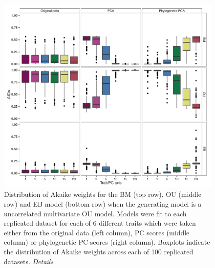 \documentclass[a4paper,12pt]{article}
\begin{document}
\begin{figure}[p]
\centering
\includegraphics[scale=0.65]{./fig/box-aicw-mvou.pdf}
\caption{Distribution of Akaike weights for the BM (top row), OU (middle row) and EB model (bottom row) when the generating model is a uncorrelated multivariate OU model. Models were fit to each replicated dataset for each of 6 different traits which were taken either from the original data (left column), PC scores (middle column) or phylogenetic PC scores (right column). Boxplots indicate the distribution of Akaike weights across each of 100 replicated datasets. \emph{Details}}
\label{aicwou}
\end{figure}
\end{document}
